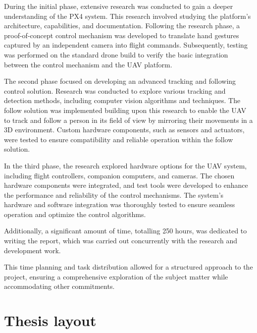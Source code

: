 During the initial phase, extensive research was conducted to gain a deeper understanding of the PX4 system. This research involved studying the platform's architecture, capabilities, and documentation. Following the research phase, a proof-of-concept control mechanism was developed to translate hand gestures captured by an independent camera into flight commands. Subsequently, testing was performed on the standard drone build to verify the basic integration between the control mechanism and the UAV platform.

The second phase focused on developing an advanced tracking and following control solution. Research was conducted to explore various tracking and detection methods, including computer vision algorithms and techniques. The follow solution was implemented building upon this research to enable the UAV to track and follow a person in its field of view by mirroring their movements in a 3D environment. Custom hardware components, such as sensors and actuators, were tested to ensure compatibility and reliable operation within the follow solution.

In the third phase, the research explored hardware options for the UAV system, including flight controllers, companion computers, and cameras. The chosen hardware components were integrated, and test tools were developed to enhance the performance and reliability of the control mechanisms. The system's hardware and software integration was thoroughly tested to ensure seamless operation and optimize the control algorithms.


Additionally, a significant amount of time, totalling 250 hours, was dedicated to writing the report, which was carried out concurrently with the research and development work.

This time planning and task distribution allowed for a structured approach to the project, ensuring a comprehensive exploration of the subject matter while accommodating other commitments.

\section{Thesis layout}
\label{sec:layout}


